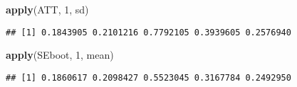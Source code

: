 \documentclass[]{article}
\newenvironment{Shaded}{\begin{snugshade}}{\end{snugshade}}
\newcommand{\KeywordTok}[1]{\textcolor[rgb]{0.13,0.29,0.53}{\textbf{#1}}}
\newcommand{\DecValTok}[1]{\textcolor[rgb]{0.00,0.00,0.81}{#1}}
\newcommand{\NormalTok}[1]{#1}
\begin{document}
\begin{Shaded}
\begin{Highlighting}[]
\KeywordTok{apply}\NormalTok{(ATT, }\DecValTok{1}\NormalTok{, sd)}
\end{Highlighting}
\end{Shaded}

\begin{verbatim}
## [1] 0.1843905 0.2101216 0.7792105 0.3939605 0.2576940
\end{verbatim}

\begin{Shaded}
\begin{Highlighting}[]
\KeywordTok{apply}\NormalTok{(SEboot, }\DecValTok{1}\NormalTok{, mean)}
\end{Highlighting}
\end{Shaded}

\begin{verbatim}
## [1] 0.1860617 0.2098427 0.5523045 0.3167784 0.2492950
\end{verbatim}
\end{document}
